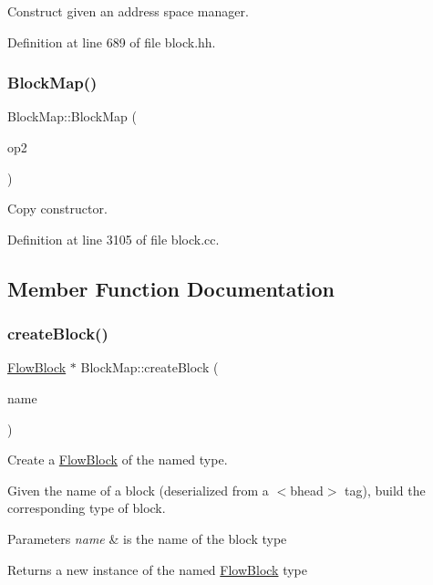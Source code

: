 Construct given an address space manager. 



Definition at line 689 of file block.\+hh.

\mbox{\label{class_block_map_a4f9c51fe087f6ec59af2c970b2ac2198}} 
\subsubsection{\texorpdfstring{BlockMap()}{BlockMap()}\hspace{0.1cm}{\footnotesize\ttfamily [2/2]}}
{\footnotesize\ttfamily Block\+Map\+::\+Block\+Map (\begin{DoxyParamCaption}\item[{const \mbox{\hyperlink{class_block_map}{Block\+Map}} \&}]{op2 }\end{DoxyParamCaption})}



Copy constructor. 



Definition at line 3105 of file block.\+cc.



\subsection{Member Function Documentation}
\mbox{\label{class_block_map_a9fd04bc95c56621511ecbcbdbbcfbcaa}} 
\subsubsection{\texorpdfstring{createBlock()}{createBlock()}}
{\footnotesize\ttfamily \mbox{\hyperlink{class_flow_block}{Flow\+Block}} $\ast$ Block\+Map\+::create\+Block (\begin{DoxyParamCaption}\item[{const string \&}]{name }\end{DoxyParamCaption})}



Create a \mbox{\hyperlink{class_flow_block}{Flow\+Block}} of the named type. 

Given the name of a block (deserialized from a $<$bhead$>$ tag), build the corresponding type of block. 
\begin{DoxyParams}{Parameters}
{\em name} & is the name of the block type \\
\hline
\end{DoxyParams}
\begin{DoxyReturn}{Returns}
a new instance of the named \mbox{\hyperlink{class_flow_block}{Flow\+Block}} type 
\end{DoxyReturn}



